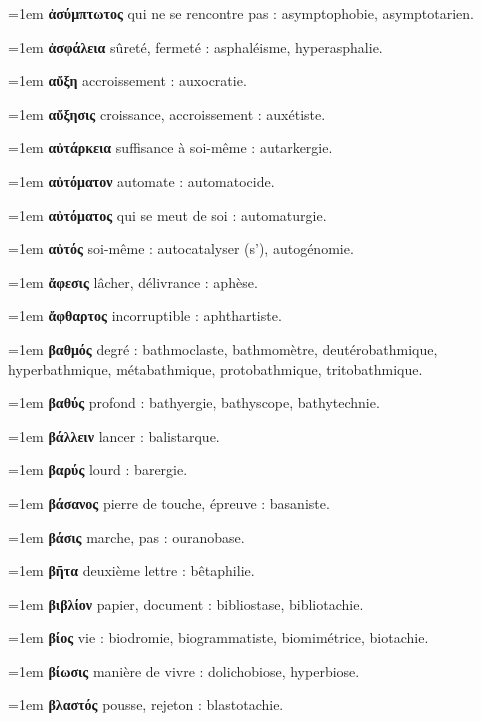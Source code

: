 \hangindent=1em \textbf{ἀσύμπτωτος} qui ne se rencontre pas : asymptophobie, asymptotarien.\par
\hangindent=1em \textbf{ἀσφάλεια} sûreté, fermeté : asphaléisme, hyperasphalie.\par
\hangindent=1em \textbf{αὔξη} accroissement : auxocratie.\par
\hangindent=1em \textbf{αὔξησις} croissance, accroissement : auxétiste.\par
\hangindent=1em \textbf{αὐτάρκεια} suffisance à soi-même : autarkergie.\par
\hangindent=1em \textbf{αὐτόματον} automate : automatocide.\par
\hangindent=1em \textbf{αὐτόματος} qui se meut de soi : automaturgie.\par
\hangindent=1em \textbf{αὐτός} soi-même : autocatalyser (s'), autogénomie.\par
\hangindent=1em \textbf{ἄφεσις} lâcher, délivrance : aphèse.\par
\hangindent=1em \textbf{ἄφθαρτος} incorruptible : aphthartiste.\par
\hangindent=1em \textbf{βαθμός} degré : bathmoclaste, bathmomètre, deutérobathmique, hyperbathmique, métabathmique, protobathmique, tritobathmique.\par
\hangindent=1em \textbf{βαθύς} profond : bathyergie, bathyscope, bathytechnie.\par
\hangindent=1em \textbf{βάλλειν} lancer : balistarque.\par
\hangindent=1em \textbf{βαρύς} lourd : barergie.\par
\hangindent=1em \textbf{βάσανος} pierre de touche, épreuve : basaniste.\par
\hangindent=1em \textbf{βάσις} marche, pas : ouranobase.\par
\hangindent=1em \textbf{βῆτα} deuxième lettre : bêtaphilie.\par
\hangindent=1em \textbf{βιβλίον} papier, document : bibliostase, bibliotachie.\par
\hangindent=1em \textbf{βίος} vie : biodromie, biogrammatiste, biomimétrice, biotachie.\par
\hangindent=1em \textbf{βίωσις} manière de vivre : dolichobiose, hyperbiose.\par
\hangindent=1em \textbf{βλαστός} pousse, rejeton : blastotachie.\par

